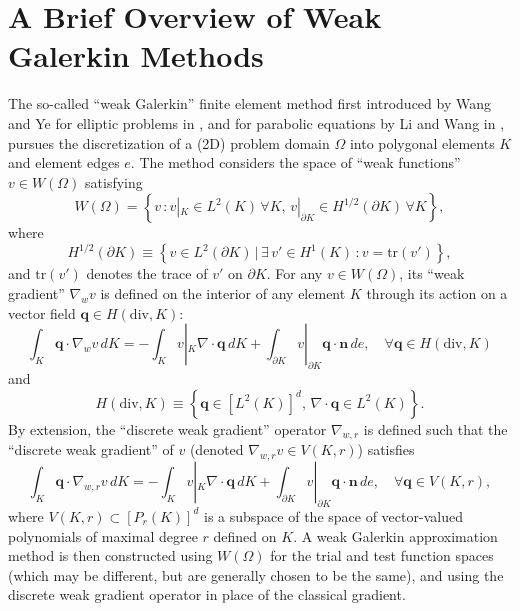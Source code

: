 \documentclass[11pt]{article} %
\begin{document}
\section*{A Brief Overview of Weak Galerkin Methods}

The so-called ``weak Galerkin'' finite element method first introduced by Wang and Ye for elliptic problems in \cite{wg_elliptic}, and for parabolic equations by Li and Wang in \cite{wg_parabolic}, pursues the discretization of a (2D) problem domain $\Omega$ into polygonal elements $K$ and element edges $e$. The method considers the space of ``weak functions'' $v \in W (\Omega)$ satisfying
\begin{equation}
	W (\Omega) = \left\{ v \, \colon v|_K \in L^2 (K) \, \forall K, \, v|_{\partial K} \in H^{1/2} (\partial K) \, \forall K \right\},
\end{equation}
where
\begin{equation}
	H^{1/2} (\partial K) \equiv \left\{ v \in L^2 (\partial K) \, | \, \exists \, v' \in H^1 (K) \, \colon v = \text{tr} (v') \right\},
\end{equation}
and $\text{tr}(v')$ denotes the trace of $v'$ on $\partial K$. For any $v \in W(\Omega)$, its ``weak gradient'' $\nabla_w v$ is defined on the interior of any element $K$ through its action on a vector field $\mathbf{q} \in H( \text{div}, K )$:
\begin{equation}
	\int_K \mathbf{q} \cdot \nabla_w v \, dK = - \int_K v|_K \nabla \cdot \mathbf{q} \, dK + \int_{\partial K} v|_{\partial K} \mathbf{q} \cdot \mathbf{n} \, de, \quad \forall \mathbf{q} \in H( \text{div}, K )
\end{equation}
and
\begin{equation}
	H( \text{div}, K ) \equiv \left\{ \mathbf{q} \in \left[ L^2 (K) \right]^d, \, \nabla \cdot \mathbf{q} \in L^2 (K) \right\}.
\end{equation}
By extension, the ``discrete weak gradient'' operator $\nabla_{w,r}$ is defined such that the ``discrete weak gradient'' of $v$ (denoted $\nabla_{w,r} v \in V (K,r)$) satisfies
\begin{equation}
	\int_K \mathbf{q} \cdot \nabla_{w,r} v \, dK = - \int_K v|_K \nabla \cdot \mathbf{q} \, dK + \int_{\partial K} v|_{\partial K} \mathbf{q} \cdot \mathbf{n} \, de, \quad \forall \mathbf{q} \in V( K, r ),
\end{equation}
where $V(K,r) \subset \left[ P_r (K) \right]^d$ is a subspace of the space of vector-valued polynomials of maximal degree $r$ defined on $K$. A weak Galerkin approximation method is then constructed using $W (\Omega)$ for the trial and test function spaces (which may be different, but are generally chosen to be the same), and using the discrete weak gradient operator in place of the classical gradient.
\end{document}
